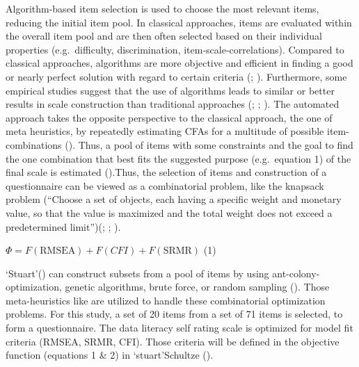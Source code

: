 \documentclass[
  12pt,
  a4paper,
  twoside]{article}
\begin{document}
Algorithm-based item selection is used to choose the most relevant items, reducing the initial item pool. In classical approaches, items are evaluated within the overall item pool and are then often selected based on their individual properties (e.g.~difficulty, discrimination, item-scale-correlations).
Compared to classical approaches, algorithms are more objective and efficient in finding a good or nearly perfect solution with regard to certain criteria (; ). Furthermore, some empirical studies suggest that the use of algorithms leads to similar or better results in scale construction than traditional approaches (; ; ). The automated approach takes the opposite perspective to the classical approach, the one of meta heuristics, by repeatedly estimating CFAs for a multitude of possible item-combinations (). Thus, a pool of items with some constraints and the goal to find the one combination that best fits the suggested purpose (e.g.~equation 1) of the final scale is estimated ().Thus, the selection of items and construction of a questionnaire can be viewed as a combinatorial problem, like the knapsack problem (``Choose a set of objects, each having a specific weight and monetary value, so that the value is maximized and the total weight does not exceed a predetermined limit'')(; ; ).

\begin{center}
$\Phi = F(\textrm{RMSEA}) + F(CFI)+ F(\textrm{SRMR}) $ (1)
\end{center}

`Stuart'() can construct subsets from a pool of items by using ant-colony-optimization, genetic algorithms, brute force, or random sampling (). Those meta-heuristics like are utilized to handle these combinatorial optimization problems.
For this study, a set of 20 items from a set of 71 items is selected, to form a questionnaire. The data literacy self rating scale is optimized for model fit criteria (RMSEA, SRMR, CFI). Those criteria will be defined in the objective function (equations 1 \& 2) in `stuart'Schultze ().
\end{document}

